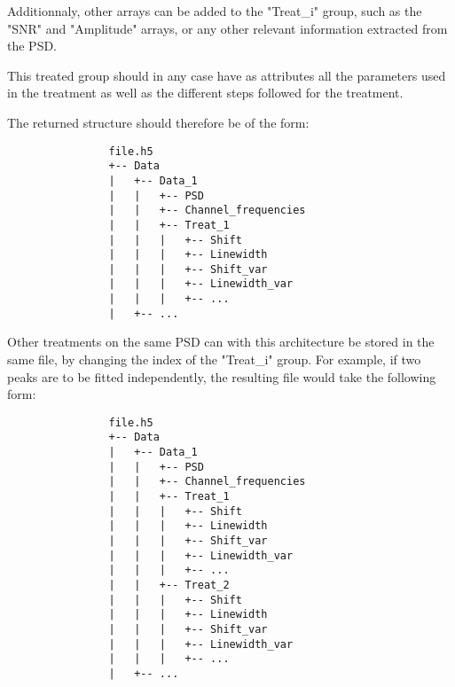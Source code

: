 \documentclass{article}
\begin{document}
            Additionnaly, other arrays can be added to the "Treat\_i" group, such as the "SNR" and "Amplitude" arrays, or any other relevant information extracted from the PSD.

            This treated group should in any case have as attributes all the parameters used in the treatment as well as the different steps followed for the treatment. 

            The returned structure should therefore be of the form:
            \begin{verbatim}
                file.h5
                +-- Data
                |   +-- Data_1
                |   |   +-- PSD
                |   |   +-- Channel_frequencies
                |   |   +-- Treat_1
                |   |   |   +-- Shift
                |   |   |   +-- Linewidth
                |   |   |   +-- Shift_var
                |   |   |   +-- Linewidth_var
                |   |   |   +-- ...
                |   +-- ...
            \end{verbatim}

            Other treatments on the same PSD can with this architecture be stored in the same file, by changing the index of the "Treat\_i" group. For example, if two peaks are to be fitted independently, the resulting file would take the following form:

            \begin{verbatim}
                file.h5
                +-- Data
                |   +-- Data_1
                |   |   +-- PSD
                |   |   +-- Channel_frequencies
                |   |   +-- Treat_1
                |   |   |   +-- Shift
                |   |   |   +-- Linewidth
                |   |   |   +-- Shift_var
                |   |   |   +-- Linewidth_var
                |   |   |   +-- ...
                |   |   +-- Treat_2
                |   |   |   +-- Shift
                |   |   |   +-- Linewidth
                |   |   |   +-- Shift_var
                |   |   |   +-- Linewidth_var
                |   |   |   +-- ...
                |   +-- ...
            \end{verbatim}
\end{document}
